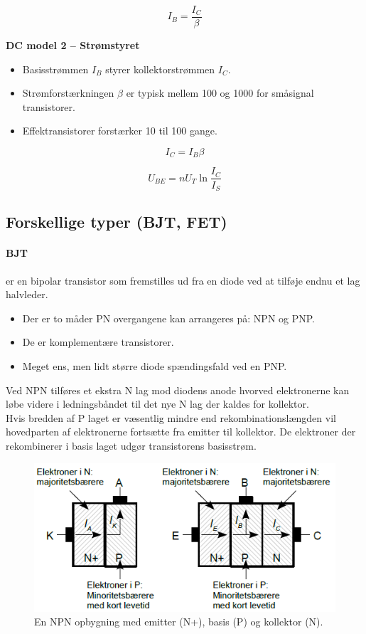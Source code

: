 \documentclass[danish]{article}
\begin{document}
\begin{equation}
I_B = \dfrac{I_C}{\beta}
\end{equation}

\textbf{DC model 2 – Strømstyret}
\begin{itemize}
	\item Basisstrømmen $I_B$ styrer kollektorstrømmen $I_C$.
	\item Strømforstærkningen ${\beta}$ er typisk mellem 100 og 1000 for småsignal transistorer.
	\item Effektransistorer forstærker 10 til 100 gange.
\end{itemize}
 
\begin{equation}
I_C = I_B {\beta}
\end{equation}

\begin{equation}
U_{BE} = n U_T \ln \dfrac{I_C}{I_S}
\end{equation}

\subsection{Forskellige typer (BJT, FET)}

\paragraph{BJT} er en bipolar transistor som fremstilles ud fra en diode ved at tilføje endnu et lag halvleder. 

\begin{itemize}
	\item Der er to måder PN overgangene kan arrangeres på: NPN og PNP.
	\item De er komplementære transistorer.
	\item Meget ens, men lidt større diode spændingsfald ved en PNP.
\end{itemize}

Ved NPN tilføres et ekstra N lag mod diodens anode hvorved elektronerne kan løbe videre i ledningsbåndet til det nye N lag der kaldes for kollektor.\\
 
Hvis bredden af P laget er væsentlig mindre end rekombinationslængden vil hovedparten af elektronerne fortsætte fra emitter til kollektor.
De elektroner der rekombinerer i basis laget udgør transistorens basisstrøm. 

\begin{figure} [H]
	\centering
	\includegraphics[width=0.7\linewidth]{graphics/bjt}
	\caption{En NPN opbygning med emitter (N+), basis (P) og kollektor (N).}
	\label{fig:bjt}
\end{figure}
\end{document}
